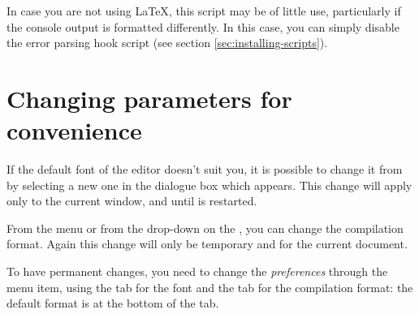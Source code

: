 In case you are not using {\LaTeX}, this script may be of little use, particularly if the console output is formatted differently. In this case, you can simply disable the error parsing hook script (see section \ref{sec:installing-scripts}).

\section{Changing {\Tw} parameters for convenience}

If the default font of the editor doesn't suit you, it is possible to change it from \submenu{} by selecting a new one in the dialogue box which appears. This change will apply only to the current window, and until {\Tw} is restarted.

From the  menu or from the drop-down on the , you can change the compilation format. Again this change will only be temporary and for the current document.

To have permanent changes, you need to change the \emph{preferences} through the \submenu{} menu item, using the  tab for the font and the  tab for the compilation format: the default format is at the bottom of the tab.

